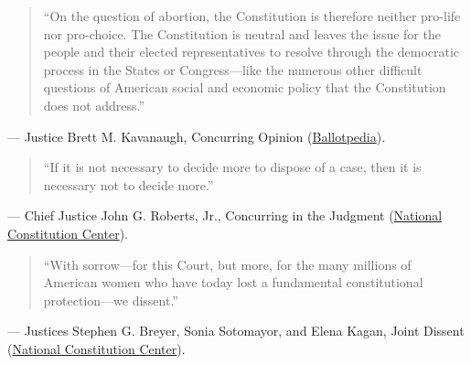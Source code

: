 \documentclass[12pt]{article}
\begin{document}
\begin{quote}
``On the question of abortion, the Constitution is therefore neither pro-life nor pro-choice. The Constitution is neutral and leaves the issue for the people and their elected representatives to resolve through the democratic process in the States or Congress---like the numerous other difficult questions of American social and economic policy that the Constitution does not address.''
\end{quote}
\noindent --- Justice Brett M. Kavanaugh, Concurring Opinion (\href{https://ballotpedia.org/Dobbs_v._Jackson_Women\%E2\%80\%99s_Health_Organization}{Ballotpedia}).

\begin{quote}
``If it is not necessary to decide more to dispose of a case, then it is necessary not to decide more.''
\end{quote}
\noindent --- Chief Justice John G. Roberts, Jr., Concurring in the Judgment (\href{https://constitutioncenter.org/the-constitution/supreme-court-case-library/dobbs-v-jackson-womens-health-organization}{National Constitution Center}).

\begin{quote}
``With sorrow---for this Court, but more, for the many millions of American women who have today lost a fundamental constitutional protection---we dissent.''
\end{quote}
\noindent --- Justices Stephen G. Breyer, Sonia Sotomayor, and Elena Kagan, Joint Dissent (\href{https://constitutioncenter.org/the-constitution/supreme-court-case-library/dobbs-v-jackson-womens-health-organization}{National Constitution Center}).
\end{document}
